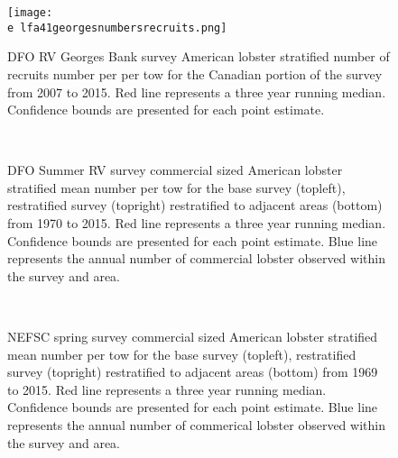 \documentclass[11pt]{article}
\newcommand{\e}{/backup/bio_data/bio.lobster/figures/} %
\begin{document}
\begin{figure}

    \texttt{[image: \\e lfa41georgesnumbersrecruits.png]}
    \caption{DFO RV Georges Bank survey American lobster stratified number of recruits number per per tow for the Canadian portion of the survey from 2007 to 2015. Red line represents a three year running median. Confidence bounds are presented for each point estimate.}

\end{figure}



\begin{figure}
\centering
{}
\\
\caption{DFO Summer RV survey commercial sized American lobster stratified mean number per tow for the base survey (topleft), restratified survey (topright) restratified to adjacent areas (bottom) from 1970 to 2015. Red line represents a three year running median. Confidence bounds are presented for each point estimate. Blue line represents the annual number of commercial lobster observed within the survey and area.}
\end{figure}
\clearpage

\begin{figure}
\centering
{}
\\
\caption{NEFSC spring survey commercial sized American lobster stratified mean number per tow for the base survey (topleft), restratified survey (topright) restratified to adjacent areas (bottom) from 1969 to 2015. Red line represents a three year running median. Confidence bounds are presented for each point estimate. Blue line represents the annual number of commerical lobster observed within the survey and area.}
\end{figure}
\clearpage
\end{document}
